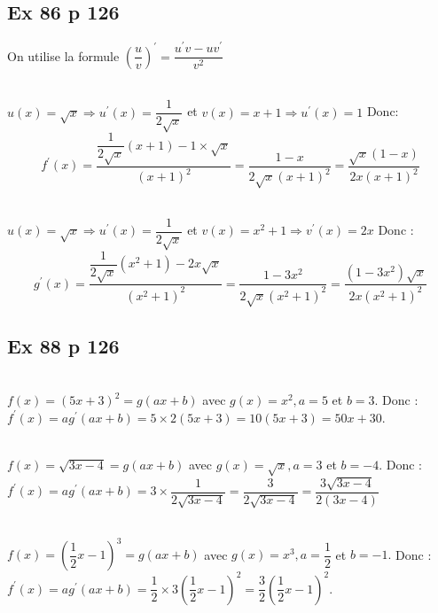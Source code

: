 \documentclass[12pt,a5paper]{book}
\begin{document}
\subsection*{Ex 86 p 126}
On utilise la formule $\left(\dfrac{u}{v}\right)^{\prime}=\dfrac{u^{\prime} v-u v^{\prime}}{v^{2}}$
\begin{enumMet}
    \item {}\\
$u(x)=\sqrt{x} \Rightarrow u^{\prime}(x)=\dfrac{1}{2 \sqrt{x}}$ et $v(x)=x+1 \Rightarrow u^{\prime}(x)=1$
Donc:\\
$$f^{\prime}(x)=\dfrac{\dfrac{1}{2 \sqrt{x}}(x+1)-1 \times \sqrt{x}}{(x+1)^{2}}=\dfrac{1-x}{2 \sqrt{x}(x+1)^{2}}=\dfrac{\sqrt{x}(1-x)}{2 x(x+1)^{2}}$$
    \item {}\\
$u(x)=\sqrt{x} \Rightarrow u^{\prime}(x)=\dfrac{1}{2 \sqrt{x}}$ et $v(x)=x^{2}+1 \Rightarrow v^{\prime}(x)=2 x$
Donc :\\
$$g^{\prime}(x)=\dfrac{\dfrac{1}{2 \sqrt{x}}\left(x^{2}+1\right)-2 x \sqrt{x}}{\left(x^{2}+1\right)^{2}}=\dfrac{1-3 x^{2}}{2 \sqrt{x}\left(x^{2}+1\right)^{2}}=\dfrac{\left(1-3 x^{2}\right) \sqrt{x}}{2 x\left(x^{2}+1\right)^{2}}$$
\end{enumMet}

\subsection*{Ex 88 p 126}

\begin{enumMet}
    \item {}\\
    $f(x)=(5 x+3)^{2}=g(a x+b)$ avec $g(x)=x^{2}, a=5$ et $b=3$. Donc : \\
    $f^{\prime}(x)=a g^{\prime}(a x+b)=5 \times 2(5 x+3)=10(5 x+3)=50 x+30$. 
\item {}\\
$f(x)=\sqrt{3 x-4}=g(a x+b)$ avec $g(x)=\sqrt{x}, a=3$ et $b=-4$.
Donc : \\
$f^{\prime}(x)=a g^{\prime}(a x+b)=3 \times \dfrac{1}{2 \sqrt{3 x-4}}=\dfrac{3}{2 \sqrt{3 x-4}}=\dfrac{3 \sqrt{3 x-4}}{2(3 x-4)}$
\item {}\\
$f(x)=\left(\dfrac{1}{2} x-1\right)^{3}=g(a x+b)$ avec $g(x)=x^{3}, a=\dfrac{1}{2}$ et $b=-1 .$ Donc : \\
$f^{\prime}(x)=a g^{\prime}(a x+b)=\dfrac{1}{2} \times 3\left(\dfrac{1}{2} x-1\right)^{2}=\dfrac{3}{2}\left(\dfrac{1}{2} x-1\right)^{2}$.
\end{enumMet}
\end{document}
